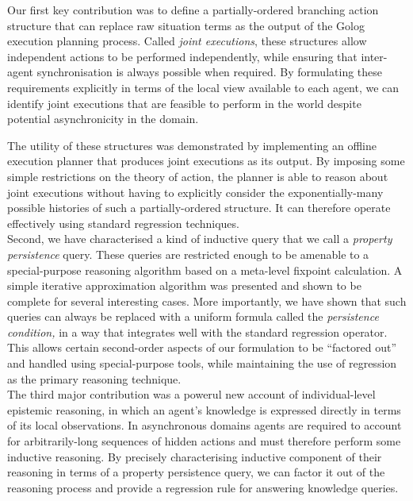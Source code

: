 Our first key contribution was to define a partially-ordered branching
action structure that can replace raw situation terms as the output
of the Golog execution planning process. Called \emph{joint executions},
these structures allow independent actions to be performed independently,
while ensuring that inter-agent synchronisation is always possible
when required. By formulating these requirements explicitly in terms
of the local view available to each agent, we can identify joint executions
that are feasible to perform in the world despite potential asynchronicity
in the domain.

The utility of these structures was demonstrated by implementing an
offline execution planner that produces joint executions as its output.
By imposing some simple restrictions on the theory of action, the
planner is able to reason about joint executions without having to
explicitly consider the exponentially-many possible histories of such
a partially-ordered structure. It can therefore operate effectively
using standard regression techniques.\\


Second, we have characterised a kind of inductive query that we call
a \emph{property persistence }query. These queries are restricted
enough to be amenable to a special-purpose reasoning algorithm based
on a meta-level fixpoint calculation. A simple iterative approximation
algorithm was presented and shown to be complete for several interesting
cases. More importantly, we have shown that such queries can always
be replaced with a uniform formula called the\emph{ persistence condition,}
in a way that integrates well with the standard regression operator.
This allows certain second-order aspects of our formulation to be
{}``factored out'' and handled using special-purpose tools, while
maintaining the use of regression as the primary reasoning technique.\\


The third major contribution was a powerul new account of individual-level
epistemic reasoning, in which an agent's knowledge is expressed directly
in terms of its local observations. In asynchronous domains agents
are required to account for arbitrarily-long sequences of hidden actions
and must therefore perform some inductive reasoning. By precisely
characterising inductive component of their reasoning in terms of
a property persistence query, we can factor it out of the reasoning
process and provide a regression rule for answering knowledge queries.

